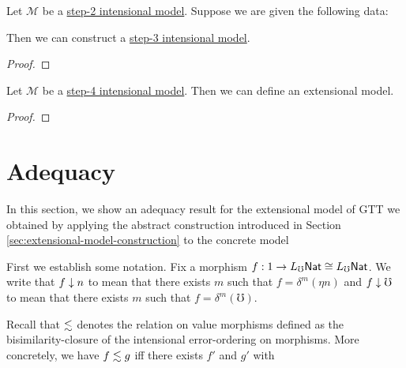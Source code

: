 
\begin{lemma}\label{lem:step-2-model-to-step-3-model}
    Let $\mathcal M$ be a \hyperref[def:step-2-model]{step-2 intensional model}.
    Suppose we are given the following data:

    Then we can construct a \hyperref[def:step-3-model]{step-3 intensional model}.
\end{lemma}
\begin{proof}

\end{proof}



\begin{lemma}\label{lem:step-4-model-to-extensional-model}
  Let $\mathcal M$ be a \hyperref[def:step-4-model]{step-4 intensional model}.
  Then we can define an extensional model.
\end{lemma}
\begin{proof}
  
  
\end{proof}



\section{Adequacy}\label{sec:appendix-adequacy}

In this section, we show an adequacy result for the extensional model of GTT we obtained by
applying the abstract construction introduced in Section
\ref{sec:extensional-model-construction} to the concrete model

First we establish some notation. Fix a morphism $f : 1 \to L_\mho \mathsf{Nat} \cong L_\mho \mathsf{Nat}$.
We write that $f \downarrow n$ to mean that there exists $m$ such that $f = \delta^m(\eta n)$
and $f \downarrow \mho$ to mean that there exists $m$ such that $f = \delta^m(\mho)$.

Recall that $\lesssim$ denotes the relation on value morphisms defined as the bisimilarity-closure
of the intensional error-ordering on morphisms.
More concretely, we have $f \lesssim g$ iff there exists $f'$ and $g'$ with

